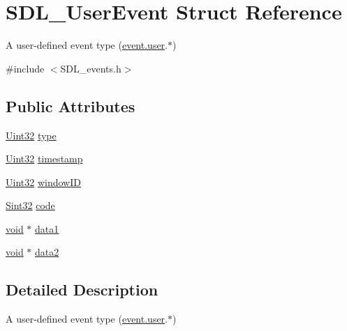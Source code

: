 \hypertarget{struct_s_d_l___user_event}{}\section{S\+D\+L\+\_\+\+User\+Event Struct Reference}
\label{struct_s_d_l___user_event}


A user-\/defined event type (\hyperlink{union_s_d_l___event_ab7c394e3ce7bf1e4f8d68bc0e9f1b042}{event.\+user}.$\ast$)  




{\ttfamily \#include $<$S\+D\+L\+\_\+events.\+h$>$}

\subsection*{Public Attributes}
\begin{DoxyCompactItemize}
\item 
\hyperlink{_s_d_l__stdinc_8h_add440eff171ea5f55cb00c4a9ab8672d}{Uint32} \hyperlink{struct_s_d_l___user_event_ab7afa8b98dbd7b52bef41155e10f7340}{type}
\item 
\hyperlink{_s_d_l__stdinc_8h_add440eff171ea5f55cb00c4a9ab8672d}{Uint32} \hyperlink{struct_s_d_l___user_event_adbf1d34c73138a0c549310e5d4ad0c35}{timestamp}
\item 
\hyperlink{_s_d_l__stdinc_8h_add440eff171ea5f55cb00c4a9ab8672d}{Uint32} \hyperlink{struct_s_d_l___user_event_abccefa10e0e0e3a0801bc6d836a08da7}{window\+ID}
\item 
\hyperlink{_s_d_l__stdinc_8h_a7a90b941db9d4582e9ad7abb9940ff7e}{Sint32} \hyperlink{struct_s_d_l___user_event_aef47976781ee82b527a353c5acfa0a34}{code}
\item 
\hyperlink{_s_d_l__opengles2__gl2ext_8h_ae5d8fa23ad07c48bb609509eae494c95}{void} $\ast$ \hyperlink{struct_s_d_l___user_event_ab2893a12be2f97195f16463a23107913}{data1}
\item 
\hyperlink{_s_d_l__opengles2__gl2ext_8h_ae5d8fa23ad07c48bb609509eae494c95}{void} $\ast$ \hyperlink{struct_s_d_l___user_event_aae4dbf65c34d654c9edf519eb061b7cf}{data2}
\end{DoxyCompactItemize}


\subsection{Detailed Description}
A user-\/defined event type (\hyperlink{union_s_d_l___event_ab7c394e3ce7bf1e4f8d68bc0e9f1b042}{event.\+user}.$\ast$) 

